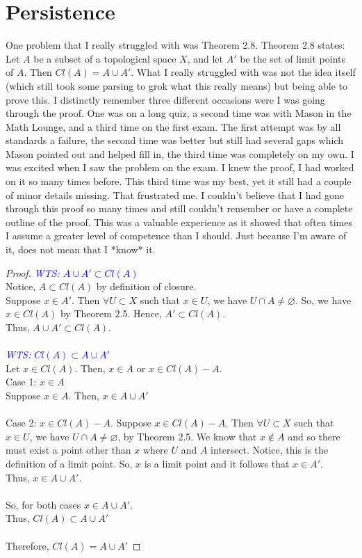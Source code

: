 \documentclass[12pt]{article}
\newcommand{\wts}[1]{\textit{\textcolor{blue}{WTS: #1}}\\}
\newcommand{\1}{^{-1}}
\begin{document}
	\section{Persistence}
	One problem that I really struggled with was Theorem 2.8. Theorem 2.8 states: Let $ A $ be a subset of a topological space $ X $, and let $ A' $ be the set of limit points of $ A $. Then $ Cl(A)=A\cup A' $. What I really struggled with was not the idea itself (which still took some parsing to grok what this really means) but being able to prove this. I distinctly remember three different occasions were I was going through the proof. One was on a long quiz, a second time was with Mason in the Math Lounge, and a third time on the first exam. The first attempt was by all standards a failure, the second time was better but still had several gaps which Mason pointed out and helped fill in, the third time was completely on my own. I was excited when I saw the problem on the exam. I knew the proof, I had worked on it so many times before. This third time was my best, yet it still had a couple of minor details missing. That frustrated me. I couldn't believe that I had gone through this proof so many times and still couldn't remember or have a complete outline of the proof. This was a valuable experience as it showed that often times I assume a greater level of competence than I should. Just because I'm aware of it, does not mean that I *know* it. \\
	\begin{proof}
		\wts{$A\cup A' \subset Cl(A)$}
		Notice, $ A \subset Cl(A) $ by definition of closure. \\
		Suppose $ x\in A' $. Then $ \forall U \subset X $ such that $ x\in U $, we have $ U\cap A \neq \varnothing $. So, we have $ x\in Cl(A) $ by Theorem 2.5. Hence, $ A'\subset Cl(A) $.\\
		Thus, $ A\cup A' \subset Cl(A) $.\\
		\\
		\wts{$Cl(A)\subset A\cup A'$}
		Let $ x\in Cl(A) $. Then, $ x\in A $ or $ x\in Cl(A)-A $.\\
		Case 1: $ x\in A $\\
		Suppose $ x\in A $. Then, $ x\in A\cup A' $\\
		\\
		Case 2: $ x\in Cl(A)-A $.
		Suppose $ x\in Cl(A)-A $.  Then $ \forall U \subset X $ such that $ x\in U $, we have $ U\cap A \neq \varnothing $, by Theorem 2.5. We know that $ x\not\in A $ and so there must exist a point other than $ x $ where $U$ and $A$ intersect. Notice, this is the definition of a limit point. So, $ x $ is a limit point and it follows that $ x\in A' $. \\
		Thus, $x\in A\cup A'$.\\
		\\
		So, for both cases $ x\in A\cup A' $.\\
		Thus, $ Cl(A)\subset A\cup A' $\\
		\\
		Therefore, $ Cl(A)=A\cup A' $
	\end{proof}
\end{document}
